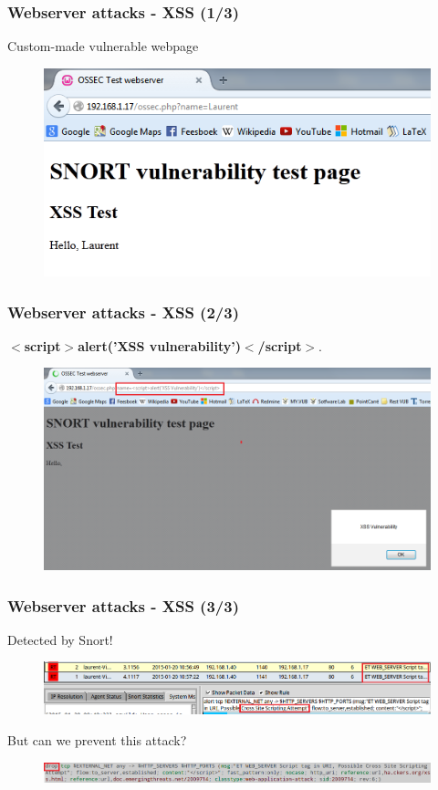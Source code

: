 \documentclass{beamer}
\begin{document}

\begin{frame}
\frametitle{Webserver attacks - XSS (1/3)}
Custom-made vulnerable webpage
\begin{figure}
   \includegraphics[width= 0.7\linewidth]{../images/VM_XSS_1.png}
\end{figure}
\end{frame}
\begin{frame}
\frametitle{Webserver attacks - XSS (2/3)}
\textbf{$<$script$>$alert('XSS vulnerability')$<$/script$>$}.
\begin{figure}
   \includegraphics[width= 0.8\linewidth]{../images/VM_XSS_2.png}
\end{figure}
\end{frame}
\begin{frame}
\frametitle{Webserver attacks - XSS (3/3)}
Detected by Snort!
\begin{figure}
   \includegraphics[width= 1\linewidth]{../images/VM_XSS_5.png}
\end{figure}
But can we prevent this attack?
\begin{figure}
   \includegraphics[width= 1\linewidth]{../images/VM_XSS_6.png}
\end{figure}
\end{frame}
\end{document}
